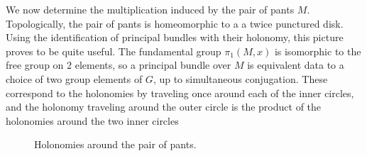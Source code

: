 \documentclass[psamsfonts, 11pt]{amsart}
\newcommand{\incfig}[2]{%
    \fontsize{48pt}{50pt}\selectfont
    \def\svgwidth{\columnwidth}
    \scalebox{#2}{}
}
\theoremstyle{definition}
\theoremstyle{remark}
\begin{document}
We now determine the multiplication induced by the pair of pants $M$. Topologically,
the pair of pants is homeomorphic to a a twice punctured disk. Using the identification
of principal bundles with their holonomy, this picture proves to be quite useful.
The fundamental group $\pi_1(M,x)$ is isomorphic to the free group on $2$ elements,
so a principal bundle over $M$ is equivalent data to a choice of two group elements
of $G$, up to simultaneous conjugation. These correspond to the holonomies by traveling
once around each of the inner circles, and the holonomy traveling around the outer
circle is the product of the holonomies around the two inner circles
\begin{figure}[ht]
    \centering
    \incfig{pants_holonomy}{.20}
    \caption{Holonomies around the pair of pants.}
\end{figure}
%
\end{document}
